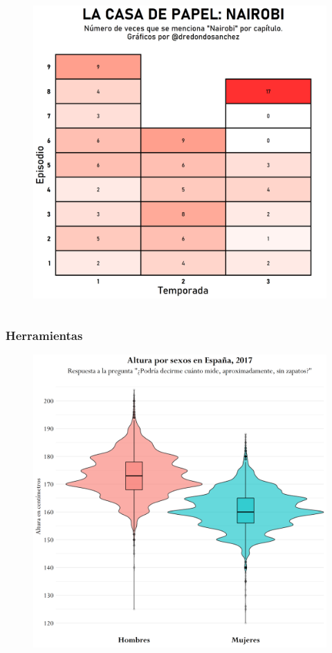 \documentclass{beamer}
\begin{document}
\begin{frame}
\begin{columns}
\begin{column}{0.5\textwidth}
\begin{figure}
			\includegraphics[width=\textwidth]{images/16.png}
		\end{figure}
	\end{column}
	\end{columns}

\end{frame}
\begin{frame}\frametitle{Herramientas}

	\vspace{-5pt}
	\begin{figure}
		\centering
		\includegraphics[width=.68\textwidth]{images/25.png}
	\end{figure}
	
\end{frame}
\end{document}
